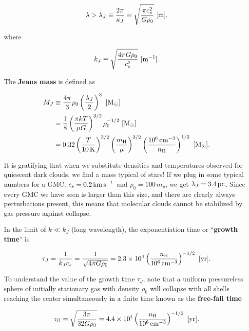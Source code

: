 \documentclass[a4paper,10pt]{article}
\begin{document}
\begin{align*}
    \lambda > \lambda_J \equiv \frac{2\pi}{\kappa_J} = \sqrt{\frac{\pi c_s^2}{G\rho_0}} ~ [{\rm m}],
\end{align*}

{\noindent}where

\begin{align*}
    k_J \equiv \sqrt{\frac{4\pi G\rho_0}{c_s^2}} ~ [{\rm m^{-1}}].
\end{align*}

{\noindent}The \textbf{Jeans mass} is defined as

\begin{align*}
    M_J &\equiv \frac{4\pi}{3}\rho_0 \left(\frac{\lambda_J}{2}\right)^3 ~ [{\rm M_\odot}] \\
        &= \frac{1}{8} \left(\frac{\pi kT}{\mu G}\right)^{3/2} \rho_0^{-1/2} ~ [{\rm M_\odot}] \\
        &= 0.32 \left(\frac{T}{10\,{\rm K}}\right)^{3/2} \left(\frac{m_{\rm H}}{\mu}\right)^{3/2} \left(\frac{10^6\,{\rm cm^{-3}}}{n_{\rm H}}\right)^{1/2}  ~ [{\rm M_\odot}].
\end{align*}

{\noindent}It is gratifying that when we substitute densities and temperatures observed for quiescent dark clouds, we find a mass typical of stars! If we plug in some typical numbers for a GMC, $c_s=0.2\,{\rm km\,s^{-1}}$ and $\rho_0=100\,m_p$, we get $\lambda_J=3.4\,{\rm pc}$. Since every GMC we have seen is larger than this size, and there are clearly always perturbations present, this means that molecular clouds cannot be stabilized by gas pressure against collapse. 

{\noindent}In the limit of $k\ll k_J$ (long wavelength), the exponentiation time or ``\textbf{growth time}'' is

\begin{align*}
    \tau_J = \frac{1}{k_Jc_s} = \frac{1}{\sqrt{4\pi G\rho_0}} = 2.3\times10^4 \left(\frac{n_{\rm H}}{10^6\,{\rm cm^{-3}}}\right)^{-1/2} ~ [{\rm yr}].
\end{align*}

{\noindent}To understand the value of the growth time $\tau_J$, note that a uniform pressureless sphere of initially stationary gas with density $\rho_0$ will collapse with all shells reaching the center simultaneously in a finite time known as the \textbf{free-fall time}

\begin{align*}
    \tau_{\rm ff} = \sqrt{\frac{3\pi}{32G\rho_0}} = 4.4\times10^4 \left(\frac{n_{\rm H}}{10^6\,{\rm cm^{-3}}}\right)^{-1/2} ~ [{\rm yr}].
\end{align*}
\end{document}
